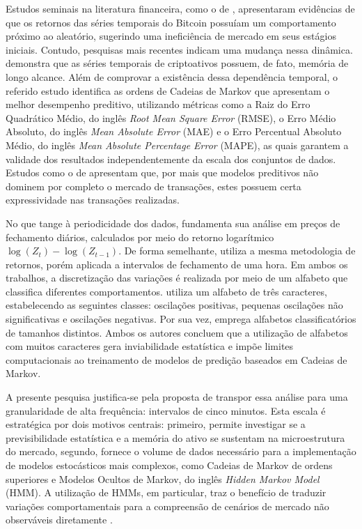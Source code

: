 \documentclass[
    12pt,                %
    openright,           %
    oneside,             %
    a4paper,             %
    english,             %
    brazil               %
]{abntex2}
\begin{document}
Estudos seminais na literatura financeira, como o de , apresentaram evidências de que os retornos das séries temporais do Bitcoin 
possuíam um comportamento próximo ao aleatório, sugerindo uma ineficiência de mercado em seus estágios iniciais. Contudo, 
pesquisas mais recentes indicam uma mudança nessa dinâmica.  demonstra que as séries temporais de criptoativos possuem, de fato, 
memória de longo alcance. Além de comprovar a existência dessa dependência temporal, o referido estudo identifica as ordens de Cadeias de Markov que apresentam 
o melhor desempenho preditivo, utilizando métricas como a Raiz do Erro Quadrático Médio, do inglês \textit{Root Mean Square Error} (RMSE), o Erro Médio Absoluto, do inglês \textit{Mean Absolute Error} (MAE) e o Erro Percentual Absoluto Médio, do inglês \textit{Mean Absolute Percentage Error} (MAPE), as quais garantem a validade dos resultados independentemente da escala dos conjuntos de dados. Estudos como o de 
apresentam que, por mais que modelos preditivos não dominem por completo o mercado de transações, estes possuem certa expressividade nas transações realizadas.

No que tange à periodicidade dos dados,  fundamenta sua análise em preços de fechamento diários, calculados por meio do retorno 
logarítmico $\log(Z_t) - \log(Z_{t-1})$. De forma semelhante,  utiliza a mesma metodologia de retornos, porém aplicada a intervalos de 
fechamento de uma hora. Em ambos os trabalhos, a discretização das variações é realizada por meio de um alfabeto que classifica diferentes comportamentos. 
 utiliza um alfabeto de três caracteres, estabelecendo as seguintes classes: oscilações positivas, pequenas oscilações não significativas e 
oscilações negativas. Por sua vez,  emprega alfabetos classificatórios de tamanhos distintos. Ambos os autores concluem que a utilização de 
alfabetos com muitos caracteres gera inviabilidade estatística e impõe limites computacionais ao treinamento de modelos de predição baseados em Cadeias de Markov.

A presente pesquisa justifica-se pela proposta de transpor essa análise para uma granularidade de alta frequência: intervalos de cinco minutos. Esta escala 
é estratégica por dois motivos centrais: primeiro, permite investigar se a previsibilidade estatística e a memória do ativo se sustentam na microestrutura do 
mercado, segundo, fornece o volume de dados necessário para a implementação de modelos estocásticos mais complexos, como Cadeias de Markov de ordens superiores
e Modelos Ocultos de Markov, do inglês \textit{Hidden Markov Model} (HMM). A utilização de HMMs, em particular, traz o benefício de traduzir variações comportamentais
para a compreensão de cenários de mercado não observáveis diretamente \cite{malekinezhad2026}.
\end{document}
